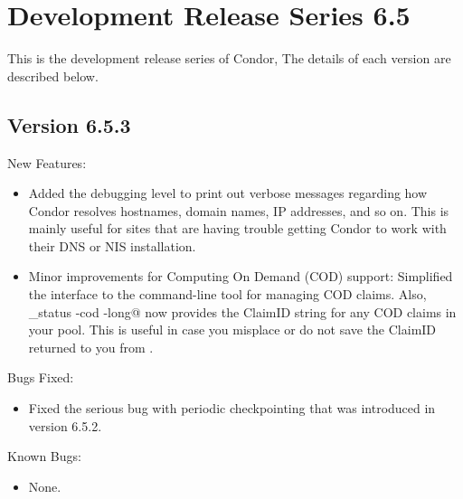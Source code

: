 \section{\label{sec:History-6-5}Development Release Series 6.5}

This is the development release series of Condor,
The details of each version are described below.

\subsection{\label{sec:New-6-5-3}Version 6.5.3}

\noindent New Features:

\begin{itemize}

\item Added the  debugging level to print out verbose
  messages regarding how Condor resolves hostnames, domain names,
  IP addresses, and so on.
  This is mainly useful for sites that are having trouble getting
  Condor to work with their DNS or NIS installation.

\item Minor improvements for Computing On Demand (COD) support: 
  Simplified the interface to the  command-line tool
  for managing COD claims.
  Also, \verb@condor_status -cod -long@ now provides the ClaimID
  string for any COD claims in your pool. 
  This is useful in case you misplace or do not save the ClaimID
  returned to you from .

\end{itemize}

\noindent Bugs Fixed:

\begin{itemize}

\item Fixed the serious bug with periodic checkpointing that was
  introduced in version 6.5.2.

\end{itemize}

\noindent Known Bugs:

\begin{itemize}

\item None.

\end{itemize}


